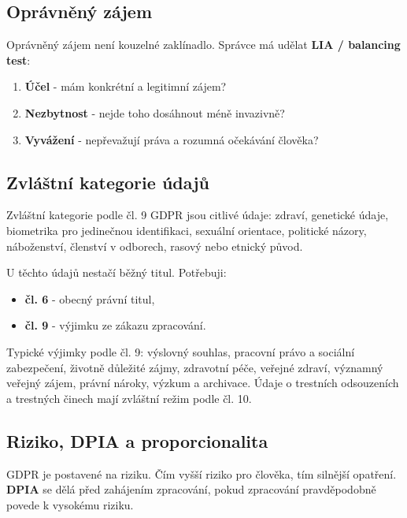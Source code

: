\subsection*{Oprávněný zájem}
Oprávněný zájem není kouzelné zaklínadlo. Správce má udělat \textbf{LIA / balancing test}:
\begin{enumerate}
  \item \textbf{Účel} - mám konkrétní a legitimní zájem?
  \item \textbf{Nezbytnost} - nejde toho dosáhnout méně invazivně?
  \item \textbf{Vyvážení} - nepřevažují práva a rozumná očekávání člověka?
\end{enumerate}


\subsection*{Zvláštní kategorie údajů}
Zvláštní kategorie podle čl. 9 GDPR jsou citlivé údaje: zdraví, genetické údaje, biometrika pro jedinečnou identifikaci, sexuální orientace, politické názory, náboženství, členství v odborech, rasový nebo etnický původ.

U těchto údajů nestačí běžný titul. Potřebuji:
\begin{itemize}
  \item \textbf{čl. 6} - obecný právní titul,
  \item \textbf{čl. 9} - výjimku ze zákazu zpracování.
\end{itemize}

Typické výjimky podle čl. 9: výslovný souhlas, pracovní právo a sociální zabezpečení, životně důležité zájmy, zdravotní péče, veřejné zdraví, významný veřejný zájem, právní nároky, výzkum a archivace. Údaje o trestních odsouzeních a trestných činech mají zvláštní režim podle čl. 10.

\subsection*{Riziko, DPIA a proporcionalita}
GDPR je postavené na riziku. Čím vyšší riziko pro člověka, tím silnější opatření. \textbf{DPIA} se dělá před zahájením zpracování, pokud zpracování pravděpodobně povede k vysokému riziku.

